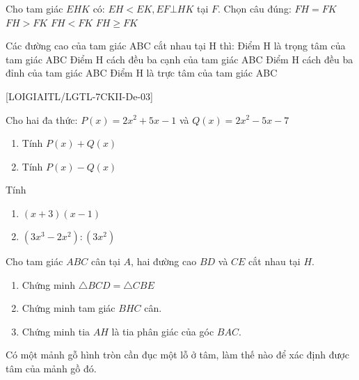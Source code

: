 \begin{ex}[NB]
Cho tam giác $EHK$ có: $EH< EK, EF\bot HK$ tại $F$. Chọn câu đúng:
	\choice
	{$FH=FK$}
	{$FH> FK$}
	{\True$FH< FK$}
	{$FH\ge FK$}
\loigiai{}
\end{ex}
\begin{ex}[NB]
Các đường cao của tam giác ABC cắt nhau tại H thì:
	\choice
	{Điểm H là trọng tâm của tam giác ABC}
	{Điểm H cách đều ba cạnh của tam giác ABC}
	{Điểm H cách đều ba đỉnh của tam giác ABC}
	{\True Điểm H là trực tâm của tam giác ABC}
	\loigiai{}
\end{ex}


%
%

[LOIGIAITL/LGTL-7CKII-De-03]
{}
\begin{bt}[2,0 điểm]
	Cho hai đa thức: $P(x)=2 x^2+5 x-1$ và $Q(x)=2 x^2-5 x-7$
	\begin{enumerate}
		\item Tính $P(x)+Q(x)$
		\item Tính $P(x)-Q(x)$
	\end{enumerate}
	\loigiai{}
\end{bt}
\begin{bt}[1,5 điểm]
	Tính
	\begin{enumerate}
		\item $(x+3)(x-1)$
		\item $\left(3x^3-2x^2\right):(3x^2)$
	\end{enumerate}
	\loigiai{}
\end{bt}
\begin{bt}[2,5 điểm]
	Cho tam giác $ABC$ cân tại $A$, hai đường cao $BD$ và $CE$ cắt nhau tại $H$.
	\begin{enumerate}
		\item Chứng minh $\triangle BCD=\triangle CBE$
		\item Chứng minh tam giác $BHC$ cân.
		\item Chứng minh tia $AH$ là tia phân giác của góc $BAC$.
	\end{enumerate}
	\loigiai{}
\end{bt}
\begin{bt}[1.0 điểm]Có một mảnh gỗ hình tròn cần đục một lỗ ở tâm, làm thế nào để xác định được tâm của mảnh gồ đó.
\loigiai{}
\end{bt}

